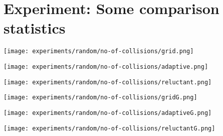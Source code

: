 \section{Experiment: Some comparison statistics}
\label{section:experiment:comparison-statistics}

\begin{center}
  \texttt{[image: experiments/random/no-of-collisions/grid.png]}
\end{center}

\begin{center}
 	\texttt{[image: experiments/random/no-of-collisions/adaptive.png]}
\end{center}

\begin{center}
  \texttt{[image: experiments/random/no-of-collisions/reluctant.png]}
\end{center}

\begin{center}
  \texttt{[image: experiments/random/no-of-collisions/gridG.png]}
\end{center}

\begin{center}
  \texttt{[image: experiments/random/no-of-collisions/adaptiveG.png]}
\end{center}

\begin{center}
  \texttt{[image: experiments/random/no-of-collisions/reluctantG.png]}
\end{center}
